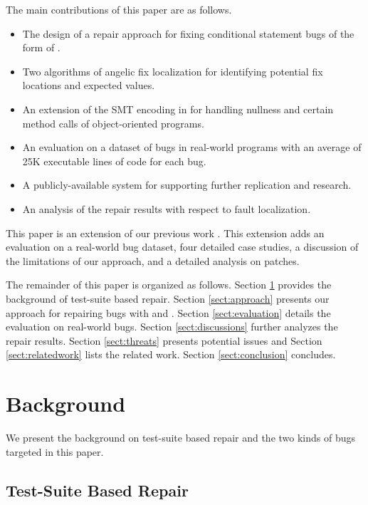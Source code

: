 The main contributions of this paper are as follows. 
\begin{itemize} 
\item The design of a repair approach for fixing conditional statement bugs of the form of \buggyandpres.
\item Two algorithms of angelic fix localization for identifying potential fix locations and expected values.
\item An extension of the SMT encoding in \cite{jha2010oracle} for handling nullness and certain method calls of object-oriented programs.
\item An evaluation on a dataset of \numbug bugs in real-world programs with an average of 25K executable lines of code for each bug.
\item A publicly-available system for supporting further replication and research. 
\item An analysis of the repair results with respect to fault localization. 
\end{itemize}

This paper is an extension of our previous work \cite{demarco2014automatic}. This extension adds an evaluation on a real-world bug dataset, four detailed case studies, a discussion of the limitations of our approach, and a detailed analysis on patches. 

The remainder of this paper is organized as follows. Section \ref{background} provides the background of test-suite based repair. Section \ref{sect:approach} presents our approach for repairing bugs with \buggyconditions and \preconditions. Section \ref{sect:evaluation} details the evaluation on \numbug real-world bugs. Section \ref{sect:discussions} further analyzes the repair results. Section \ref{sect:threats} presents potential issues and Section \ref{sect:relatedwork} lists the related work. Section \ref{sect:conclusion} concludes.

\section{Background}
\label{background}

We present the background on test-suite based repair and the two kinds of bugs targeted in this paper. 

\subsection{Test-Suite Based Repair}
\label{sect:test-suite-based-repair}


